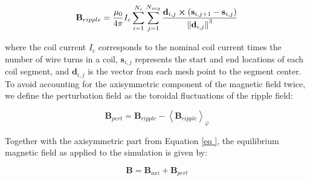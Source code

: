 \begin{equation}
	\textbf{B}_{ripple} = \frac{\mu_0}{4\pi}I_c\sum_{i=1}^{N_{c}}\sum_{j=1}^{N_{seg}}\frac{\textbf{d}_{i,j}\cross\left(\textbf{s}_{i,j+1} - \textbf{s}_{i,j}\right)}{\norm{\textbf{d}_{i,j}}^3}
\end{equation}

where the coil current $I_c$ corresponds to the nominal coil current times the number of wire turns in a coil, $\textbf{s}_{i,j}$ represents the start and end locations of each coil segment, and $\textbf{d}_{i,j}$ is the vector from each mesh point to the segment center. To avoid accounting for the axisymmetric component of the magnetic field twice, we define the perturbation field as the toroidal fluctuations of the ripple field:


\begin{equation}
	\textbf{B}_{pert} = \textbf{B}_{ripple} - \left<\textbf{B}_{ripple}\right>_\varphi
\end{equation}


Together with the axisymmetric part from Equation \ref{eq
}, the equilibrium magnetic field as applied to the simulation is given by:

\begin{equation}
	\textbf{B} = \textbf{B}_{axi} + \textbf{B}_{pert}
\end{equation}

